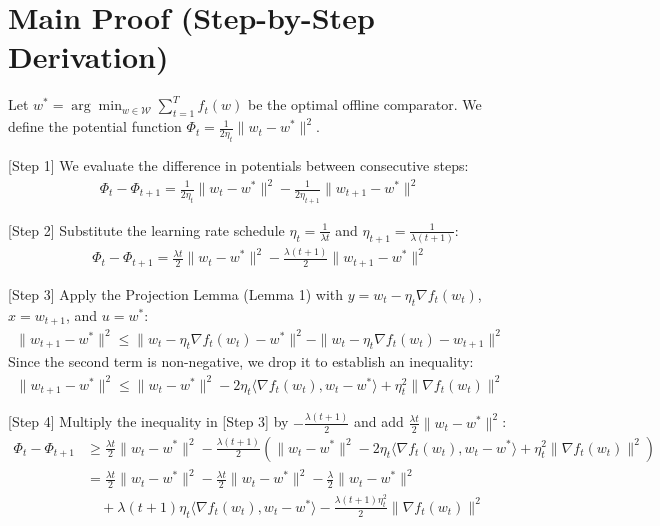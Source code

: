 \documentclass{article}
\begin{document}
\section*{Main Proof (Step-by-Step Derivation)}
Let $w^* = \arg\min_{w \in \mathcal{W}} \sum_{t=1}^T f_t(w)$ be the optimal offline comparator. We define the potential function $\Phi_t = \frac{1}{2\eta_t} \|w_t - w^*\|^2$. 

[Step 1] We evaluate the difference in potentials between consecutive steps:
\begin{align*}
\Phi_t - \Phi_{t+1} = \frac{1}{2\eta_t} \|w_t - w^*\|^2 - \frac{1}{2\eta_{t+1}} \|w_{t+1} - w^*\|^2
\end{align*}

[Step 2] Substitute the learning rate schedule $\eta_t = \frac{1}{\lambda t}$ and $\eta_{t+1} = \frac{1}{\lambda(t+1)}$:
\begin{align*}
\Phi_t - \Phi_{t+1} = \frac{\lambda t}{2} \|w_t - w^*\|^2 - \frac{\lambda (t+1)}{2} \|w_{t+1} - w^*\|^2
\end{align*}

[Step 3] Apply the Projection Lemma (Lemma 1) with $y = w_t - \eta_t \nabla f_t(w_t)$, $x = w_{t+1}$, and $u = w^*$:
\begin{align*}
\|w_{t+1} - w^*\|^2 \leq \|w_t - \eta_t \nabla f_t(w_t) - w^*\|^2 - \|w_t - \eta_t \nabla f_t(w_t) - w_{t+1}\|^2
\end{align*}
Since the second term is non-negative, we drop it to establish an inequality:
\begin{align*}
\|w_{t+1} - w^*\|^2 \leq \|w_t - w^*\|^2 - 2\eta_t \langle \nabla f_t(w_t), w_t - w^* \rangle + \eta_t^2 \|\nabla f_t(w_t)\|^2
\end{align*}

[Step 4] Multiply the inequality in [Step 3] by $-\frac{\lambda(t+1)}{2}$ and add $\frac{\lambda t}{2} \|w_t - w^*\|^2$:
\begin{align*}
\Phi_t - \Phi_{t+1} &\geq \frac{\lambda t}{2} \|w_t - w^*\|^2 - \frac{\lambda (t+1)}{2} \left( \|w_t - w^*\|^2 - 2\eta_t \langle \nabla f_t(w_t), w_t - w^* \rangle + \eta_t^2 \|\nabla f_t(w_t)\|^2 \right) \\
&= \frac{\lambda t}{2} \|w_t - w^*\|^2 - \frac{\lambda t}{2} \|w_t - w^*\|^2 - \frac{\lambda}{2} \|w_t - w^*\|^2 \\
&\quad + \lambda(t+1)\eta_t \langle \nabla f_t(w_t), w_t - w^* \rangle - \frac{\lambda(t+1)\eta_t^2}{2} \|\nabla f_t(w_t)\|^2
\end{align*}
\end{document}
